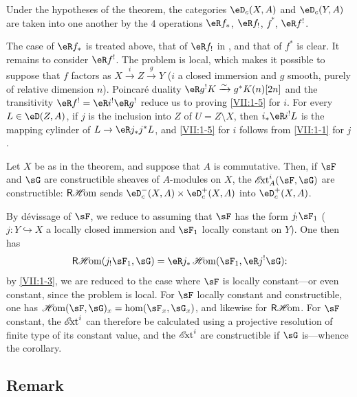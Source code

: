 \begin{corollary_}\label{VII:1-5}
Under the hypotheses of the theorem, the categories $\eD_c(X,A)$ and
$\eD_c(Y,A)$ are taken into one another by the $4$ operations
$\eR f_\ast$, $\eR f_!$, $f^\ast$, $\eR f^!$.
\end{corollary_}

The case of $\eR f_\ast$ is treated above, that of $\eR f_!$ in
\cite[XVII 5.3]{sga4}, and that of $f^\ast$ is clear. It remains to consider
$\eR f^!$. The problem is local, which makes it possible to suppose that $f$
factors as $X\xrightarrow i Z \xrightarrow g Y$ ($i$ a closed immersion and
$g$ smooth, purely of relative dimension $n$). Poincaré duality
$\eR g^! K \iso g^\ast K(n)[2 n]$ and the transitivity
$\eR f^! = \eR i^! \eR g^!$ reduce us to proving \ref{VII:1-5} for $i$.
For every $L\in \eD(Z,A)$, if $j$ is the inclusion into $Z$ of
$U=Z\setminus X$, then $i_\ast \eR i^! L$ is the mapping cylinder of
$L\to \eR j_\ast j^\ast L$, and \ref{VII:1-5} for $i$ follows from
\ref{VII:1-1} for $j$.






\begin{corollary_}\label{VII:1-6}
Let $X$ be as in the theorem, and suppose that $A$ is commutative. Then, if
$\sF$ and $\sG$ are constructible sheaves of $A$-modules on $X$, the
$\Ext_A^i(\sF,\sG)$ are constructible: $\operatorname{\mathsf{R}\mathscr{H}\!om}$ sends
$\eD_c^-(X,A)\times \eD_c^+(X,A)$ into $\eD_c^+(X,A)$.
\end{corollary_}

By dévissage of $\sF$, we reduce to assuming that $\sF$ has the form
$j_!\sF_1$ ($j:Y\hookrightarrow X$ a locally closed immersion and $\sF_1$
locally constant on $Y$). One then has
\[
  \rHom(j_! \sF_1,\sG) = \eR j_\ast \Hom(\sF_1,\eR j^! \sG) \text{:}
\]
by \ref{VII:1-3}, we are reduced to the case where $\sF$ is locally
constant---or even constant, since the problem is local. For $\sF$ locally
constant and constructible, one has
$\Hom(\sF,\sG)_x=\hom(\sF_x,\sG_x)$, and likewise for $\operatorname{\mathsf{R}\mathscr{H}\!om}$. For $\sF$
constant, the $\operatorname{\mathscr{E}\!xt}^i$ can therefore be calculated using a projective
resolution of finite type of its constant value, and the $\operatorname{\mathscr{E}\!xt}^i$ are
constructible if $\sG$ is---whence the corollary.






\subsection{Remark}\label{VII:1-7}

